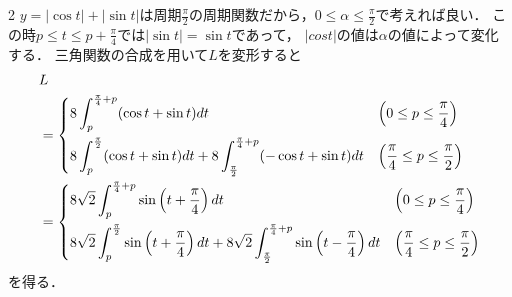 \documentclass[../../../../main.tex]{subfiles}
\begin{document}
\begin{multicols}{2}
  $y=|\cos t| + |\sin t|$は周期$\frac{\pi}{2}$の周期関数だから，$0 \le \alpha \le \frac{\pi}{2}$で考えれば良い．
  この時$p \le t \le p + \frac{\pi}{4}$では$|\sin t| = \sin t$であって，
  $|cos t|$の値は$\alpha$の値によって変化する．
  三角関数の合成を用いて$L$を変形すると
  \begin{align*}
     & L                                                                                                                                                                                                                                         \\
     & = \begin{dcases}
           8\int_{p}^{\frac{\pi}{4}+p} (\cos t + \sin t) dt                                                               & \left(0 \le p \le \frac{\pi}{4}\right)             \\
           8\int_{p}^{\frac{\pi}{2}} (\cos t + \sin t) dt + 8\int_{\frac{\pi}{2}}^{\frac{\pi}{4}+p} (-\cos t + \sin t) dt & \left(\frac{\pi}{4} \le p \le \frac{\pi}{2}\right)
         \end{dcases}                                                 \\
     & = \begin{dcases}
           8\sqrt{2}\int_{p}^{\frac{\pi}{4}+p} \sin\left(t + \frac{\pi}{4}\right) dt                                                                                      & \left(0 \le p \le \frac{\pi}{4}\right)             \\
           8\sqrt{2}\int_{p}^{\frac{\pi}{2}}\sin\left(t + \frac{\pi}{4}\right) dt + 8\sqrt{2}\int_{\frac{\pi}{2}}^{\frac{\pi}{4}+p} \sin\left(t - \frac{\pi}{4}\right) dt & \left(\frac{\pi}{4} \le p \le \frac{\pi}{2}\right)
         \end{dcases}
  \end{align*}
  を得る．


\end{multicols}
\end{document}
